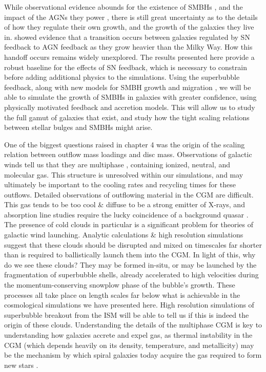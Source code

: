 While observational evidence abounds for the existence of SMBHs
\citep{Kormendy2013}, and the impact of the AGNs they power
\citep{Veilleux2005}, there is still great uncertainty as to the details of how
they regulate their own growth, and the growth of the galaxies they live in.
\citet{Keller2016a} showed evidence that a transition occurs between galaxies
regulated by SN feedback to AGN feedback as they grow heavier than the Milky
Way.  How this handoff occurs remains widely unexplored.  The results presented
here provide a robust baseline for the effects of SN feedback, which is
necessary to constrain before adding additional physics to the simulations.
Using the superbubble feedback, along with new models for SMBH growth
\citep{Hopkins2010} and migration \citep{Tremmel2015}, we will be able to
simulate the growth of SMBHs in galaxies with greater confidence, using
physically motivated feedback and accretion models.  This will allow us to study
the full gamut of galaxies that exist, and study how the tight scaling relations
between stellar bulges and SMBHs might arise.

One of the biggest questions raised in chapter 4 was the origin of the scaling
relation between outflow mass loadings and disc mass.  Observations of galactic
winds tell us that they are multiphase \citep{Stark1984,Wakker1997,Weiner2009},
containing ionized, neutral, and molecular gas.  This structure is unresolved
within our simulations, and may ultimately be important to the cooling rates and
recycling times for these outflows.  Detailed observations of outflowing
material in the CGM are difficult. This gas tends to be too cool \& diffuse to
be a strong emitter of X-rays, and absorption line studies require the lucky
coincidence of a background quasar \citep{Weiner2009}.  The presence of cold
clouds in particular is a significant problem for theories of galactic wind
launching.  Analytic calculations \& high resolution
simulations suggest that these clouds should be disrupted and mixed on
timescales far shorter than is required to ballistically launch them into the
CGM.  In light of this, why do we see these clouds?  They may be formed in-situ,
or may be launched by the fragmentation of superbubble shells, already
accelerated to high velocities during the momentum-conserving snowplow phase of
the bubble's growth.  These processes all take place on length scales far below
what is achievable in the cosmological simulations we have presented here.
High resolution simulations of superbubble breakout from
the ISM will be able to tell us if this is indeed the origin of these clouds.
Understanding the details of the multiphase CGM is key to
understanding how galaxies accrete and expel gas, as thermal instability in the
CGM (which depends heavily on its density, temperature, and metallicity) may be
the mechanism by which spiral galaxies today acquire the gas required to
form new stars \citep{Marasco2012}.  

